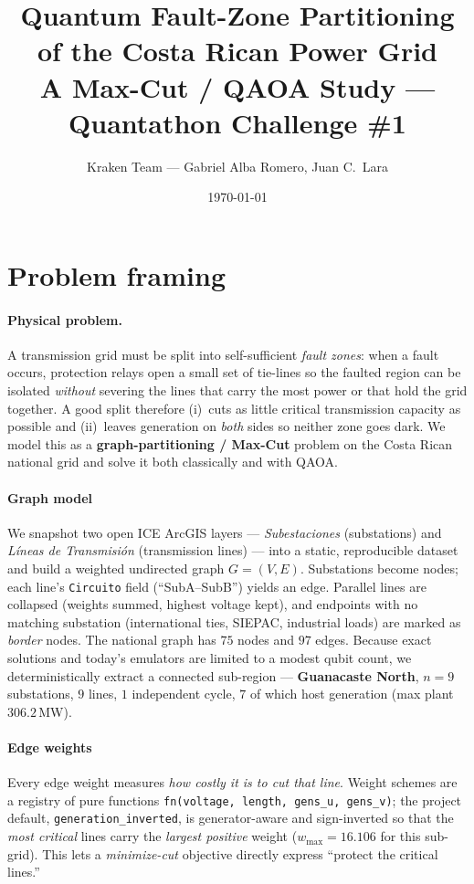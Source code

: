 \documentclass[10pt]{article}
\title{\vspace{-1.2cm}\textbf{Quantum Fault-Zone Partitioning of the Costa Rican
Power Grid}\\[2pt]\large A Max-Cut / QAOA Study --- Quantathon Challenge \#1}
\author{Kraken Team --- Gabriel Alba Romero, Juan C.\ Lara}
\date{\today}
\begin{document}
\maketitle
\vspace{-0.7cm}

\section{Problem framing}

\paragraph{Physical problem.} A transmission grid must be split into
self-sufficient \emph{fault zones}: when a fault occurs, protection relays open
a small set of tie-lines so the faulted region can be isolated \emph{without}
severing the lines that carry the most power or that hold the grid together.
A good split therefore (i)~cuts as little critical transmission capacity as
possible and (ii)~leaves generation on \emph{both} sides so neither zone goes
dark. We model this as a \textbf{graph-partitioning / Max-Cut} problem on the
Costa Rican national grid and solve it both classically and with QAOA.

\paragraph{Graph model} We snapshot two open ICE ArcGIS layers ---
\emph{Subestaciones} (substations) and \emph{L\'ineas de Transmisi\'on}
(transmission lines) --- into a static, reproducible dataset and build a
weighted undirected graph $G=(V,E)$. Substations become nodes; each line's
\texttt{Circuito} field (``SubA--SubB'') yields an edge. Parallel lines are
collapsed (weights summed, highest voltage kept), and endpoints with no matching
substation (international ties, SIEPAC, industrial loads) are marked as
\emph{border} nodes. The national graph has $75$ nodes and $97$ edges. Because
exact solutions and today's emulators are limited to a modest qubit count, we
deterministically extract a connected sub-region --- \textbf{Guanacaste North},
$n=9$ substations, $9$ lines, $1$ independent cycle, $7$ of which host
generation (max plant $306.2$\,MW).

\paragraph{Edge weights} Every edge weight measures \emph{how
costly it is to cut that line}. Weight schemes are a registry of pure functions
\texttt{fn(voltage, length, gens\_u, gens\_v)}; the project default,
\texttt{generation\_inverted}, is generator-aware and sign-inverted so that the
\emph{most critical} lines carry the \emph{largest positive} weight
($w_{\max}=16.106$ for this sub-grid). This lets a \emph{minimize-cut} objective
directly express ``protect the critical lines.''
\end{document}
